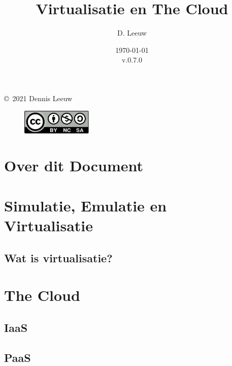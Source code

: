 \documentclass[a4paper,12pt,twoside,openright,titlepage]{book}
\author{D. Leeuw}
\title{Virtualisatie en The Cloud}
\date{\today\\v.0.7.0}
\begin{document}

\maketitle

\copyright\ 2021 Dennis Leeuw\\

\begin{figure}[H]
\includegraphics[width=0.3\textwidth]{CC-BY-SA-NC.png}
\end{figure}

\bigskip




\frontmatter
\chapter{Over dit Document}



\tableofcontents

\mainmatter
\chapter{Simulatie, Emulatie en Virtualisatie}

\section{Wat is virtualisatie?}




\chapter{The Cloud}

\section{IaaS}

\section{PaaS}

\end{document}

